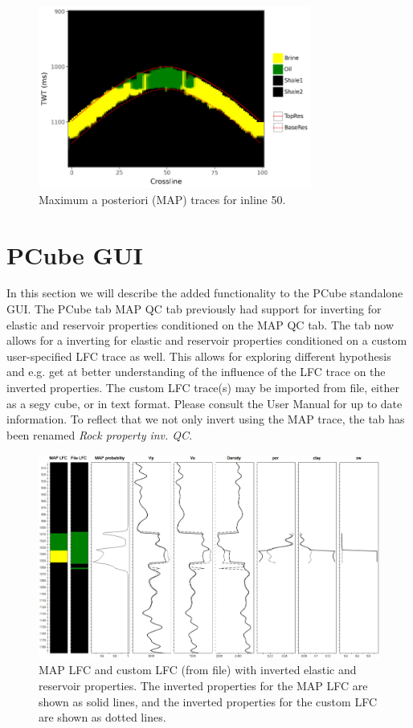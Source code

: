 \documentclass[note,screen,english,12pt,utf8]{nrdoc}
\begin{document}
\begin{figure}[h]
    \centering
    \includegraphics[width=0.8\textwidth]{figures/map_traces.png}
    \caption{Maximum a posteriori (MAP) traces for inline 50.}
    \label{fig:map_traces}
\end{figure}


\section{PCube GUI}

In this section we will describe the added functionality to the PCube standalone GUI.
The PCube tab MAP QC tab previously had support for inverting for elastic and reservoir
properties conditioned on the MAP QC tab. The tab now allows for a inverting for elastic
and reservoir properties conditioned on a custom user-specified LFC trace as well.
This allows for exploring different hypothesis and e.g. get at better understanding of the influence of the
LFC trace on the inverted properties. The custom LFC trace(s) may be imported from file,
either as a segy cube, or in text format. Please consult the User Manual for up to date
information. To reflect that we not only invert using the MAP trace, the tab has been renamed
\emph{Rock property inv. QC}.

\begin{figure}[h]
    \centering
    \includegraphics[width=\textwidth]{figures/gui_property_inversion_tab_il57_xl62_file.png}
    \caption{MAP LFC and custom LFC (from file) with inverted elastic and reservoir properties.
    The inverted properties for the MAP LFC are shown as solid lines, and
    the inverted properties for the custom LFC are shown as dotted lines.
    }
    \label{fig:custom_lfc_property_inversion_tab}
\end{figure}
\end{document}
